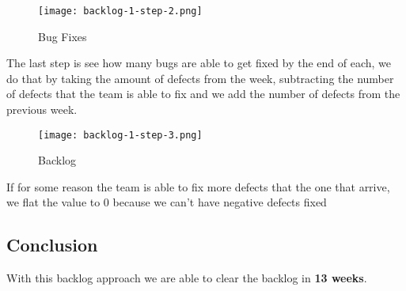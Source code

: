 \begin{figure}[!htb]
    \centering
    \texttt{[image: backlog-1-step-2.png]}    
    \caption{Bug Fixes}
\end{figure}

\noindent
The last step is see how many bugs are able to get fixed by the end of each,
we do that by taking the amount of defects from the week, subtracting the 
number of defects that the team is able to fix and we add the number of defects 
from the previous week. \newline

\begin{figure}[!htb]
    \centering
    \texttt{[image: backlog-1-step-3.png]}    
    \caption{Backlog}
\end{figure}

\noindent
If for some reason the team is able to fix more defects that the one that 
arrive, we flat the value to 0 because we can't have negative defects fixed

\subsection{Conclusion}
With this backlog approach we are able to clear the backlog in \textbf{13 weeks}.
